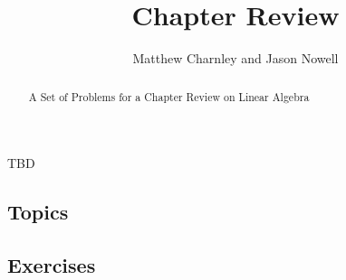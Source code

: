 \documentclass{ximera}
\title{Chapter Review}
\author{Matthew Charnley and Jason Nowell}
\begin{document}
\begin{abstract}
    A Set of Problems for a Chapter Review on Linear Algebra
\end{abstract}
\maketitle

TBD

\subsection{Topics}

\subsection{Exercises}
\end{document}
